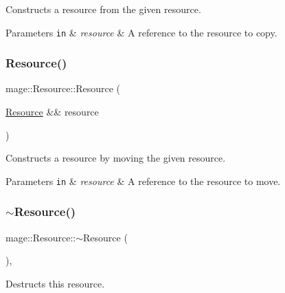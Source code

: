 Constructs a resource from the given resource.


\begin{DoxyParams}[1]{Parameters}
\mbox{\tt in}  & {\em resource} & A reference to the resource to copy. \\
\hline
\end{DoxyParams}
\hypertarget{classmage_1_1_resource_a3f96177d661b3c3b6e7ac9fa6eba4130}{}\label{classmage_1_1_resource_a3f96177d661b3c3b6e7ac9fa6eba4130} 
\subsubsection{\texorpdfstring{Resource()}{Resource()}\hspace{0.1cm}{\footnotesize\ttfamily [3/3]}}
{\footnotesize\ttfamily mage\+::\+Resource\+::\+Resource (\begin{DoxyParamCaption}\item[{\hyperlink{classmage_1_1_resource}{Resource} \&\&}]{resource }\end{DoxyParamCaption})\hspace{0.3cm}{\ttfamily [default]}}

Constructs a resource by moving the given resource.


\begin{DoxyParams}[1]{Parameters}
\mbox{\tt in}  & {\em resource} & A reference to the resource to move. \\
\hline
\end{DoxyParams}
\hypertarget{classmage_1_1_resource_a9721681581176960987a9aef6bac26aa}{}\label{classmage_1_1_resource_a9721681581176960987a9aef6bac26aa} 
\subsubsection{\texorpdfstring{$\sim$\+Resource()}{~Resource()}}
{\footnotesize\ttfamily mage\+::\+Resource\+::$\sim$\+Resource (\begin{DoxyParamCaption}{ }\end{DoxyParamCaption})\hspace{0.3cm}{\ttfamily [virtual]}, {\ttfamily [default]}}

Destructs this resource. 

